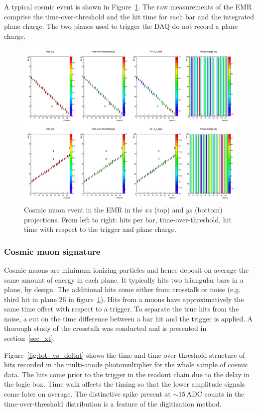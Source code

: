 \documentclass[a4paper,11pt]{article}
\begin{document}
A typical cosmic event is shown in Figure~\ref{fig:cosmic_muon}. The raw measurements of the EMR comprise the time-over-threshold and the hit time for each bar and the integrated plane charge. The two planes used to trigger the DAQ do not record a plane charge.

\begin{figure}[!htr]
\centering
\includegraphics[width=\textwidth]{cosmic_event.png}
\caption{Cosmic muon event in the EMR in the $xz$ (top) and $yz$ (bottom) projections. From left to right: hits per bar, time-over-threshold, hit time with respect to the trigger and plane charge.}
\label{fig:cosmic_muon}
\end{figure}

\subsubsection{Cosmic muon signature}\label{sec:cosmic_sig}
Cosmic muons are minimum ionizing particles and hence deposit on average the same amount of energy in each plane. It typically hits two triangular bars in a plane, by design. The additional hits come either from crosstalk or noise (e.g. third hit in plane 26 in figure~\ref{fig:cosmic_muon}). Hits from a muons have approximatively the same time offset with respect to a trigger. To separate the true hits from the noise, a cut on the time difference between a bar hit and the trigger is applied. A thorough study of the crosstalk was conducted and is presented in section~\ref{sec_xt}.
 
Figure~\ref{fig:tot_vs_deltat} shows the time and time-over-threshold structure of hits recorded in the multi-anode photomultiplier for the whole sample of cosmic data. The hits come prior to the trigger in the readout chain due to the delay in the logic box. Time walk affects the timing so that the lower amplitude signals come later on average. The distinctive spike present at $\sim15$\,ADC counts in the time-over-threshold distribution is a feature of the digitization method.
\end{document}
